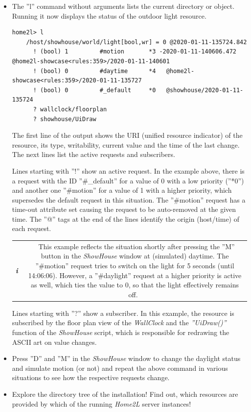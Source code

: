 \documentclass[12pt,english,parskip=half,headheight=19pt]{scrreprt}
\newcommand{\infobox}[1]{
  \par
  \medskip
  \hfill
  \setlength\arrayrulewidth{1pt}
  \begin{tabular}[t]{c|c|}
    \parbox{1.8em}{\hfill\textit{\Huge\textbf{i}\,}}
    &
    \,\parbox{0.89\linewidth}{\setlength{\parskip}{0.5em} \small #1}\,
  \end{tabular}
  \medskip
  \par
}
\begin{document}
\begin{itemize}[$\blacktriangleright$]
\item
  The ''l'' command without arguments lists the current directory or object.
  Running it now displays the status of the outdoor light resource.
  \begin{lstlisting}[language=home2l]
    home2l> l
    /host/showhouse/world/light[bool,wr] = 0 @2020-01-11-135724.842
      ! (bool) 1         #motion       *3 -2020-01-11-140606.472   @home2l-showcase<rules:359>/2020-01-11-140601
      ! (bool) 0         #daytime      *4   @home2l-showcase<rules:359>/2020-01-11-135727
      ! (bool) 0         #_default     *0   @showhouse/2020-01-11-135724
      ? wallclock/floorplan
      ? showhouse/UiDraw
  \end{lstlisting}

  The first line of the output shows the URI (unified resource indicator)
  of the resource, its type, writability, current value and the time of
  the last change. The next lines list the active requests and
  subscribers.

  Lines starting with ''!'' show an active request. In the example
  above, there is a request with the ID ''\#\_default'' for a value of 0
  with a low priority (''*0'') and another one ''\#motion'' for a value of 1
  with a higher priority, which supersedes the default request in this
  situation. The ''\#motion'' request has a time-out attribute set causing
  the request to be auto-removed at the given time. The ''@'' tags at the
  end of the lines identify the origin (host/time) of each request.

  \infobox{
    This example reflects the situation shortly after pressing the ''M''
    button in the \textit{ShowHouse} window at (simulated) daytime.
    The ''\#motion'' request tries to switch on the light for 5 seconds
    (until 14:06:06). However, a ''\#daylight'' request at a higher
    priority is active as well, which ties the value to 0, so that the
    light effectively remains off.
  }

  Lines starting with ''?'' show a subscriber. In this example, the resource is subscribed by
  the floor plan view of the \textit{WallClock} and the \textit{''UiDraw()''} function of
  the \textit{ShowHouse} script, which is responsible for redrawing the ASCII art on value changes.

\item
  Press ''D'' and ''M'' in the \textit{ShowHouse} window to change the daylight
  status and simulate motion (or not) and repeat the above command in
  various situations to see how the respective requests change.

\item
  Explore the directory tree of the installation! Find out, which resources are
  provided by which of the running \textit{Home2L} server instances!

\end{itemize}
\end{document}
